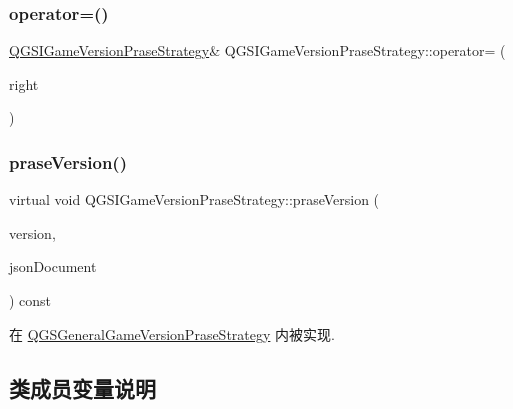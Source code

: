 \subsubsection{\texorpdfstring{operator=()}{operator=()}\hspace{0.1cm}{\footnotesize\ttfamily [2/2]}}
{\footnotesize\ttfamily \mbox{\hyperlink{class_q_g_s_i_game_version_prase_strategy}{Q\+G\+S\+I\+Game\+Version\+Prase\+Strategy}}\& Q\+G\+S\+I\+Game\+Version\+Prase\+Strategy\+::operator= (\begin{DoxyParamCaption}\item[{\mbox{\hyperlink{class_q_g_s_i_game_version_prase_strategy}{Q\+G\+S\+I\+Game\+Version\+Prase\+Strategy}} \&\&}]{right }\end{DoxyParamCaption})\hspace{0.3cm}{\ttfamily [default]}}

\mbox{\label{class_q_g_s_i_game_version_prase_strategy_a6670763377fd8f61b9f84198b432dbf5}} 
\subsubsection{\texorpdfstring{prase\+Version()}{praseVersion()}}
{\footnotesize\ttfamily virtual void Q\+G\+S\+I\+Game\+Version\+Prase\+Strategy\+::prase\+Version (\begin{DoxyParamCaption}\item[{\mbox{\hyperlink{class_q_g_s_game_version}{Q\+G\+S\+Game\+Version}} \&}]{version,  }\item[{Q\+Json\+Document \&}]{json\+Document }\end{DoxyParamCaption}) const\hspace{0.3cm}{\ttfamily [pure virtual]}}



在 \mbox{\hyperlink{class_q_g_s_general_game_version_prase_strategy_a97b6266d0c89c224a8d70a9187c8bfca}{Q\+G\+S\+General\+Game\+Version\+Prase\+Strategy}} 内被实现.



\subsection{类成员变量说明}
\mbox{\label{class_q_g_s_i_game_version_prase_strategy_a6aaa9d101e8c4faae261a39d97ea3c01}} 
